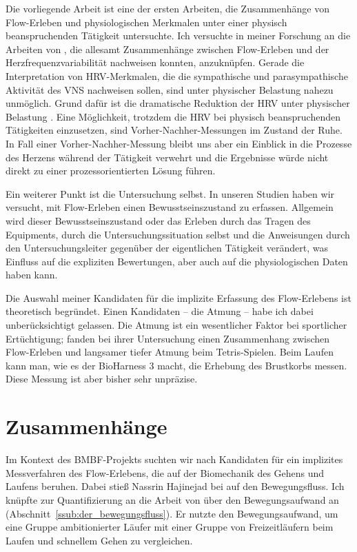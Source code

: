 Die vorliegende Arbeit ist eine der ersten Arbeiten, die Zusammenhänge von Flow-Erleben und physiologischen Merkmalen unter einer physisch beanspruchenden Tätigkeit untersuchte. Ich versuchte in meiner Forschung an die Arbeiten von \citet{deManzano2010, Keller2011, Gaggioli2013, Peifer2014, Tozman2015, Harmat2015}, die allesamt Zusammenhänge zwischen Flow-Erleben und der Herzfrequenzvariabilität nachweisen konnten, anzuknüpfen. Gerade die Interpretation von \ac{HRV}-Merkmalen, die die sympathische und parasympathische Aktivität des \ac{VNS} nachweisen sollen, sind unter physischer Belastung nahezu unmöglich. Grund dafür ist die dramatische Reduktion der \ac{HRV} unter physischer Belastung \citep{Hoos2010}. Eine Möglichkeit, trotzdem die \ac{HRV} bei physisch beanspruchenden Tätigkeiten einzusetzen, sind Vorher-Nachher-Messungen im Zustand der Ruhe. In Fall einer Vorher-Nachher-Messung bleibt uns aber ein Einblick in die Prozesse des Herzens während der Tätigkeit verwehrt und die Ergebnisse würde nicht direkt zu einer prozessorientierten Lösung führen. 

Ein weiterer Punkt ist die Untersuchung selbst. In unseren Studien haben wir versucht, mit Flow-Erleben einen Bewusstseinszustand zu erfassen. Allgemein wird dieser Bewusstseinszustand oder das Erleben durch das Tragen des Equipments, durch die Untersuchungssituation selbst und die Anweisungen durch den Untersuchungsleiter gegenüber der eigentlichen Tätigkeit verändert, was Einfluss auf die expliziten Bewertungen, aber auch auf die physiologischen Daten haben kann.

Die Auswahl meiner Kandidaten für die implizite Erfassung des Flow-Erlebens ist theoretisch begründet. Einen Kandidaten -- die Atmung -- habe ich dabei unberücksichtigt gelassen. Die Atmung ist ein wesentlicher Faktor bei sportlicher Ertüchtigung; \citet{Harmat2015} fanden bei ihrer Untersuchung einen Zusammenhang zwischen Flow-Erleben und langsamer tiefer Atmung beim Tetris-Spielen. Beim Laufen kann man, wie es der BioHarness 3 macht, die Erhebung des Brustkorbs messen. Diese Messung ist aber bisher sehr unpräzise. 

\section{Zusammenhänge} 

\label{sec:zusammenhange}

Im Kontext des \acs{BMBF}-Projekts suchten wir nach Kandidaten für ein implizites Messverfahren des Flow-Erlebens, die auf der Biomechanik des Gehens und Laufens beruhen. Dabei stieß Nassrin Hajinejad bei \citet[][S.~121]{Meinel2007} auf den Bewegungsfluss.  Ich knüpfte zur Quantifizierung an die Arbeit von \citet{Hreljac2000} über den Bewegungsaufwand an (Abschnitt~\ref{ssub:der_bewegungsfluss}). Er nutzte den Bewegungsaufwand, um eine Gruppe ambitionierter Läufer mit einer Gruppe von Freizeitläufern beim Laufen und schnellem Gehen zu vergleichen. 

